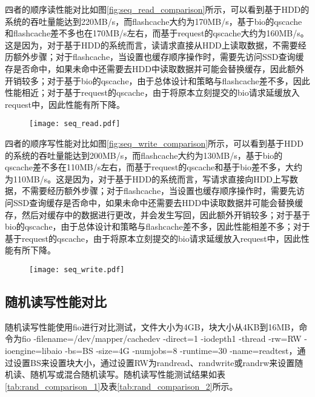 四者的顺序读性能对比如图\ref{fig:seq_read_comparison}所示，可以看到基于HDD的系统的吞吐量能达到220MB/s，而flashcache大约为170MB/s，基于bio的qscache和flashcache差不多也在170MB/s左右，而基于request的qscache大约为160MB/s。这是因为，对于基于HDD的系统而言，读请求直接从HDD上读取数据，不需要经历额外步骤；对于flashcache，当设置也缓存顺序操作时，需要先访问SSD查询缓存是否命中，如果未命中还需要去HDD中读取数据并可能会替换缓存，因此额外开销较多；对于基于bio的qscache，由于总体设计和策略与flashcache差不多，因此性能相近；对于基于request的qscache，由于将原本立刻提交的bio请求延缓放入request中，因此性能有所下降。

\begin{figure}[H]
    \centering
    \texttt{[image: seq\_read.pdf]}
\end{figure}

四者的顺序写性能对比如图\ref{fig:seq_write_comparison}所示，可以看到基于HDD的系统的吞吐量能达到200MB/s，而flashcache大约为130MB/s，基于bio的qscache差不多在110MB/s左右，而基于request的qscache和基于bio差不多，大约为110MB/s。这是因为，对于基于HDD的系统而言，写请求直接向HDD上写数据，不需要经历额外步骤；对于flashcache，当设置也缓存顺序操作时，需要先访问SSD查询缓存是否命中，如果未命中还需要去HDD中读取数据并可能会替换缓存，然后对缓存中的数据进行更改，并会发生写回，因此额外开销较多；对于基于bio的qscache，由于总体设计和策略与flashcache差不多，因此性能相差不多；对于基于request的qscache，由于将原本立刻提交的bio请求延缓放入request中，因此性能有所下降。

\begin{figure}[H]
    \centering
    \texttt{[image: seq\_write.pdf]}
\end{figure}

\subsection{随机读写性能对比}

随机读写性能使用fio进行对比测试，文件大小为4GB，块大小从4KB到16MB，命令为fio -filename=/dev/mapper/cachedev -direct=1 -iodepth1 -thread -rw=RW -ioengine=libaio -bs=BS -size=4G -numjobs=8 -runtime=30 -name=readtest，通过设置BS来设置块大小，通过设置RW为randread、randwrite或randrw来设置随机读、随机写或混合随机读写。随机读写性能测试结果如表\ref{tab:rand_comparison_1}及表\ref{tab:rand_comparison_2}所示。

